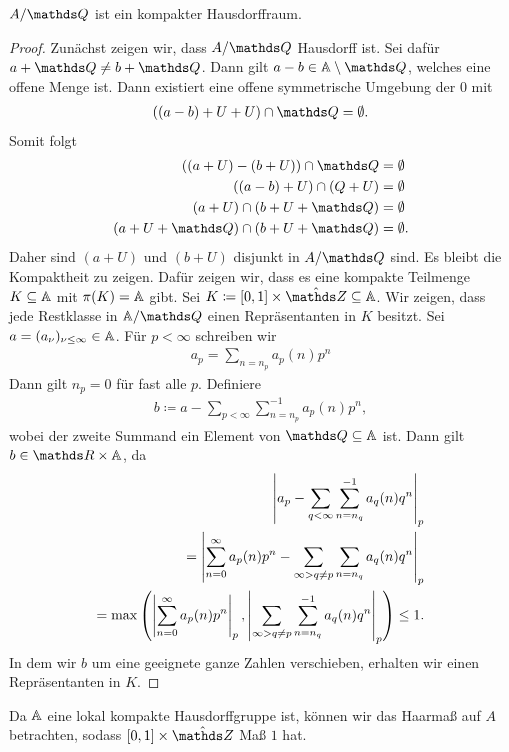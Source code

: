 \begin{prop}
$A/\Q$ ist ein kompakter Hausdorffraum.
\end{prop}
\begin{proof}
Zunächst zeigen wir, dass $A/\Q$ Hausdorff ist.
Sei dafür $a+\Q\not = b+\Q$. Dann gilt $a-b \in \mathbb{A}\setminus \Q$, welches eine offene Menge ist.
Dann existiert eine offene symmetrische Umgebung der $0$ mit
\begin{align*}
((a-b)+U+U)\cap \Q=\emptyset.
\end{align*}
Somit folgt
\begin{align*}
((a+U)-(b+U))\cap \Q &= \emptyset\\
((a-b)+U)\cap (Q+ U)&=\emptyset\\
(a+U)\cap (b+U+\Q)&=\emptyset\\
(a+U+\Q)\cap (b+U+\Q)&=\emptyset.
\end{align*}
Daher sind $(a+U)$ und $(b+U)$ disjunkt in $A/\Q$ sind.
Es bleibt die Kompaktheit zu zeigen.
Dafür zeigen wir, dass es eine kompakte Teilmenge $K \subseteq \mathbb{A}$ mit $\pi(K)=\mathbb{A}$ gibt.
Sei $K\coloneqq [0,1]\times \hat{\Z}\subseteq \A$.
Wir zeigen, dass jede Restklasse in $\A/\Q$ einen Repräsentanten in $K$ besitzt.
Sei $a=(a_\nu)_{\nu \leq \infty} \in \mathbb{A}$. Für $p<\infty$ schreiben wir
\begin{align*}
a_p=\sum_{n=n_p} a_p(n)p^n
\end{align*}
Dann gilt $n_p=0$ für fast alle $p$.
Definiere
\begin{align*}
b\coloneqq a- \sum_{p<\infty}\sum_{n=n_p}^{-1} a_p(n)p^n,
\end{align*}
wobei der zweite Summand ein Element von $\Q \subseteq \A$ ist.
Dann gilt $b \in \R \times \A$, da
\begin{align*}
\left\vert a_p-\sum_{q<\infty} \sum_{n=n_q}^{-1} a_q(n)q^n\right\vert_p\\
=\left\vert\sum_{n=0}^\infty a_p(n)p^n-\sum_{\infty>q\not =p} \sum_{n=n_q} a_q(n)q^n\right\vert_p\\
=\max \left(\left\vert\sum_{n=0}^\infty a_p(n)p^n\right\vert_p,\left\vert\sum_{\infty>q\not =p} \sum_{n=n_q}^{-1} a_q(n)q^n\right\vert_p\right) \leq 1.
\end{align*}
In dem wir $b$ um eine geeignete ganze Zahlen verschieben, erhalten wir einen Repräsentanten in $K$.
\end{proof}

Da $\mathbb{A}$ eine lokal kompakte Hausdorffgruppe ist, können wir das Haarmaß auf $A$ betrachten, sodass $[0,1]\times \hat{\Z}$ Maß $1$ hat.

